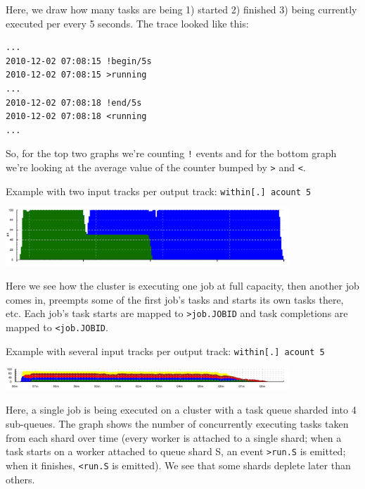 \documentclass{article}
\begin{document}
Here, we draw how many tasks are being 1) started 2) finished 3) being currently executed per every 5 seconds. The trace looked like this:

\begin{verbatim}
...
2010-12-02 07:08:15 !begin/5s
2010-12-02 07:08:15 >running
...
2010-12-02 07:08:18 !end/5s
2010-12-02 07:08:18 <running
...
\end{verbatim}

So, for the top two graphs we're counting \texttt{!} events and for the bottom graph we're looking at the average value of the counter bumped by \texttt{>} and \texttt{<}.

Example with two input tracks per output track: \texttt{within[.] acount 5}

{\centering \includegraphics[width=0.8\textwidth]{pics/tplot/tplot-preemption.png}}

Here we see how the cluster is executing one job at full capacity, then another job comes in, preempts some of the first job's tasks and starts its own tasks there, etc. Each job's task starts are mapped to \texttt{>job.JOBID} and task completions are mapped to \texttt{<job.JOBID}.

Example with several input tracks per output track: \texttt{within[.] acount 5}

{\centering \includegraphics[width=0.8\textwidth]{pics/tplot/tplot-4rmq.png}}

Here, a single job is being executed on a cluster with a task queue sharded into 4 sub-queues. The graph shows the number of concurrently executing tasks taken from each shard over time (every worker is attached to a single shard; when a task starts on a worker attached to queue shard S, an event \texttt{>run.S} is emitted; when it finishes, \texttt{<run.S} is emitted). We see that some shards deplete later than others.

\end{document}

